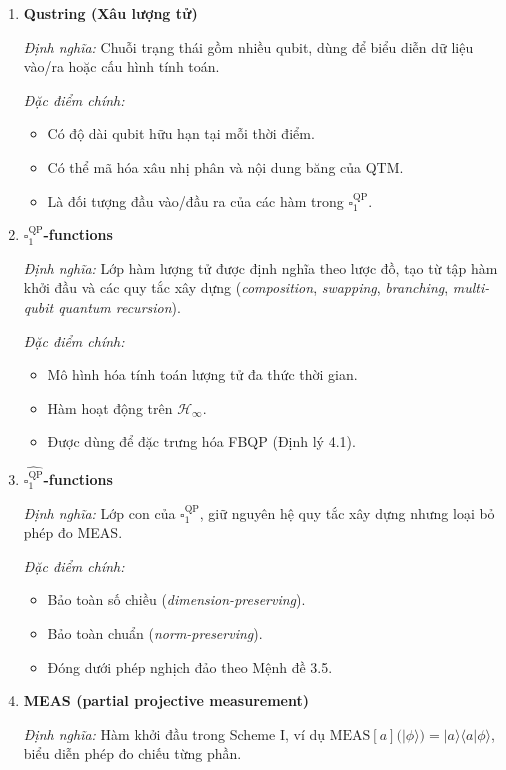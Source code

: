 \documentclass[12pt,a4paper]{article}
\begin{document}
\begin{enumerate}[leftmargin=*,itemsep=0.8em]
\item \textbf{Qustring (Xâu lượng tử)}

\textit{Định nghĩa:} Chuỗi trạng thái gồm nhiều qubit, dùng để biểu diễn dữ liệu vào/ra hoặc cấu hình tính toán.

\textit{Đặc điểm chính:}
\begin{itemize}[leftmargin=1.5em]
\item Có độ dài qubit hữu hạn tại mỗi thời điểm.
\item Có thể mã hóa xâu nhị phân và nội dung băng của QTM.
\item Là đối tượng đầu vào/đầu ra của các hàm trong $\square_{1}^{\mathrm{QP}}$.
\end{itemize}

\item \textbf{$\square_{1}^{\mathrm{QP}}$-functions}

\textit{Định nghĩa:} Lớp hàm lượng tử được định nghĩa theo lược đồ, tạo từ tập hàm khởi đầu và các quy tắc xây dựng (\textit{composition}, \textit{swapping}, \textit{branching}, \textit{multi-qubit quantum recursion}).

\textit{Đặc điểm chính:}
\begin{itemize}[leftmargin=1.5em]
\item Mô hình hóa tính toán lượng tử đa thức thời gian.
\item Hàm hoạt động trên $\mathcal{H}_{\infty}$.
\item Được dùng để đặc trưng hóa FBQP (Định lý 4.1).
\end{itemize}

\item \textbf{$\widehat{\square_{1}^{\mathrm{QP}}}$-functions}

\textit{Định nghĩa:} Lớp con của $\square_{1}^{\mathrm{QP}}$, giữ nguyên hệ quy tắc xây dựng nhưng loại bỏ phép đo MEAS.

\textit{Đặc điểm chính:}
\begin{itemize}[leftmargin=1.5em]
\item Bảo toàn số chiều (\textit{dimension-preserving}).
\item Bảo toàn chuẩn (\textit{norm-preserving}).
\item Đóng dưới phép nghịch đảo theo Mệnh đề 3.5.
\end{itemize}

\item \textbf{MEAS (partial projective measurement)}

\textit{Định nghĩa:} Hàm khởi đầu trong Scheme I, ví dụ $\mathrm{MEAS}[a](|\phi\rangle)=|a\rangle\langle a|\phi\rangle$, biểu diễn phép đo chiếu từng phần.


\end{enumerate}
\end{document}
